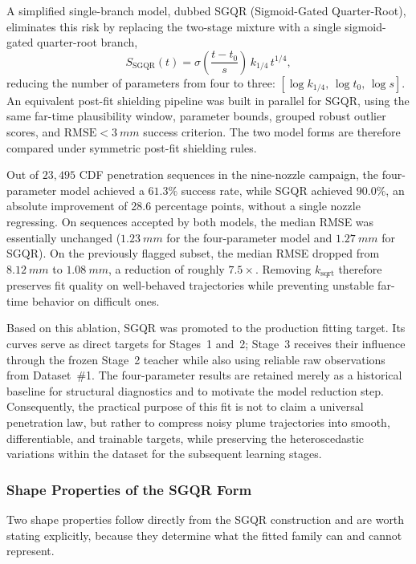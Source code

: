 A simplified single-branch model, dubbed SGQR (Sigmoid-Gated Quarter-Root), eliminates this risk by replacing the two-stage mixture with a single sigmoid-gated quarter-root branch,
\[
S_{\mathrm{SGQR}}(t) = \sigma\!\left(\frac{t-t_0}{s}\right)\,k_{1/4}\,t^{1/4},
\]
reducing the number of parameters from four to three: \([\log k_{1/4},\,\log t_0,\,\log s]\). An equivalent post-fit shielding pipeline was built in parallel for SGQR, using the same far-time plausibility window, parameter bounds, grouped robust outlier scores, and \(\mathrm{RMSE}<\SI{3}{mm}\) success criterion. The two model forms are therefore compared under symmetric post-fit shielding rules.

Out of \(23{,}495\) CDF penetration sequences in the nine-nozzle campaign, the four-parameter model achieved a \(61.3\%\) success rate, while SGQR achieved \(90.0\%\), an absolute improvement of 28.6 percentage points, without a single nozzle regressing. On sequences accepted by both models, the median RMSE was essentially unchanged (\(\SI{1.23}{mm}\) for the four-parameter model and \(\SI{1.27}{mm}\) for SGQR). On the previously flagged subset, the median RMSE dropped from \(\SI{8.12}{mm}\) to \(\SI{1.08}{mm}\), a reduction of roughly \(7.5\times\). Removing \(k_{\mathrm{sqrt}}\) therefore preserves fit quality on well-behaved trajectories while preventing unstable far-time behavior on difficult ones.

Based on this ablation, SGQR was promoted to the production fitting target. Its curves serve as direct targets for Stages~1 and~2; Stage~3 receives their influence through the frozen Stage~2 teacher while also using reliable raw observations from Dataset~\#1. The four-parameter results are retained merely as a historical baseline for structural diagnostics and to motivate the model reduction step. Consequently, the practical purpose of this fit is not to claim a universal penetration law, but rather to compress noisy plume trajectories into smooth, differentiable, and trainable targets, while preserving the heteroscedastic variations within the dataset for the subsequent learning stages.

\subsubsection{Shape Properties of the SGQR Form}
\label{sec:SGQR-shape-properties-en}

Two shape properties follow directly from the SGQR construction and are worth stating explicitly, because they determine what the fitted family can and cannot represent.

